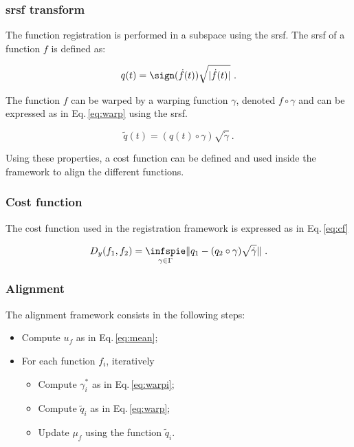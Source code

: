 \subsubsection{\acl*{srsf} transform}

The function registration is performed in a subspace using the \ac{srsf}. The \ac{srsf} of a function $f$ is defined as:

\begin{equation}
  q(t) = \sign(\dot{f}(t))\sqrt{|\dot{f}(t)|} \ .
  \label{eq:srsf}
\end{equation}

The function $f$ can be warped by a warping function $\gamma$, denoted $f \circ \gamma$ and can be expressed as in Eq.\,\ref{eq:warp} using the \ac{srsf}.

\begin{equation}
  \tilde{q}(t) = (q(t) \circ \gamma) \sqrt{\dot{\gamma}} \ .
  \label{eq:warp}
\end{equation}

Using these properties, a cost function can be defined and used inside the framework to align the different functions.

\subsubsection{Cost function}

The cost function used in the registration framework is expressed as in Eq.\,\ref{eq:cf}

\begin{equation}
  D_y(f_1, f_2) = \underset{\gamma \in \Gamma}{\infspie} \| q_1 - (q_2 \circ \gamma) \sqrt{\dot{\gamma}} \| \ .
  \label{eq:cf}
\end{equation}

\subsubsection{Alignment}

The alignment framework consists in the following steps:

\begin{itemize}
  \item Compute $u_f$ as in Eq.\,\ref{eq:mean};
  \item For each function $f_i$, iteratively
    \begin{itemize}
      \item Compute $\gamma_{i}^{*}$ as in Eq.\,\ref{eq:warpi};
      \item Compute $\tilde{q}_i$ as in Eq.\,\ref{eq:warp};
      \item Update $\mu_f$ using the function $\tilde{q}_i$.
    \end{itemize}
\end{itemize}


